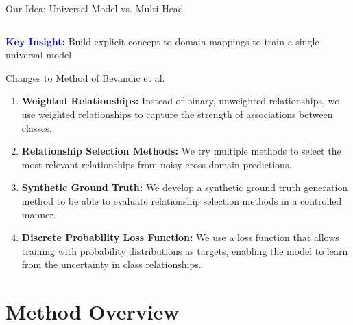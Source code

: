 \documentclass[aspectratio=169]{beamer}
\begin{document}
\begin{frame}{Our Idea: Universal Model vs. Multi-Head}
\begin{columns}[T]
\begin{column}{0.48\textwidth}
\begin{center}
            \end{center}
        \end{column}
    \end{columns}

    \vspace{1em}

    \textcolor{blue}{\textbf{Key Insight:}} Build explicit concept-to-domain mappings to train a single universal model
\end{frame}

\begin{frame}{Changes to Method of Bevandic et al.}
    \begin{enumerate}
        \item \textbf{Weighted Relationships:} Instead of binary, unweighted relationships, we use weighted relationships to capture the strength of associations between classes.
        \item \textbf{Relationship Selection Methods:} We try multiple methods to select the most relevant relationships from noisy cross-domain predictions.
        \item \textbf{Synthetic Ground Truth:} We develop a synthetic ground truth generation method to be able to evaluate relationship selection methods in a controlled manner.
        \item \textbf{Discrete Probability Loss Function:} We use a loss function that allows training with probability distributions as targets, enabling the model to learn from the uncertainty in class relationships.
    \end{enumerate}
\end{frame}

\section{Method Overview}
\end{document}
